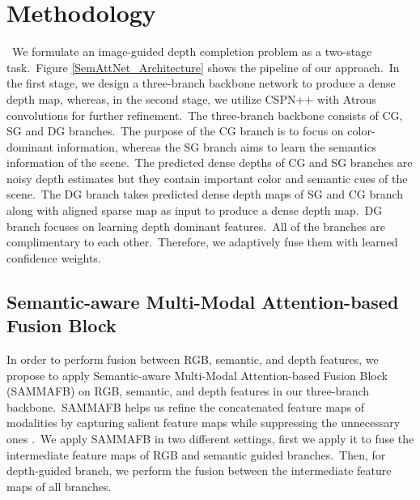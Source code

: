 \documentclass{ieeeaccess}
\begin{document}
\section{Methodology}


~We formulate an image-guided depth completion problem as a two-stage task.~Figure \ref{SemAttNet_Architecture} shows the pipeline of our approach.~In the first stage, we design a three-branch backbone network to produce a dense depth map, whereas, in the second stage, we utilize CSPN++ \cite{hu2020PENet, cheng2020cspn++} with Atrous convolutions for further refinement.~The three-branch backbone consists of CG, SG and DG branches.~The purpose of the CG branch is to focus on color-dominant information, whereas the SG branch aims to learn the semantics information of the scene.~The predicted dense depths of CG and SG branches are noisy depth estimates but they contain important color and semantic cues of the scene.~The DG branch takes predicted dense depth maps of SG and CG branch along with aligned sparse map as input to produce a dense depth map.~DG branch focuses on learning depth dominant features.~All of the branches are complimentary to each other.~Therefore, we adaptively fuse them with learned confidence weights.


\subsection{Semantic-aware Multi-Modal Attention-based Fusion Block}

In order to perform fusion between RGB, semantic, and depth features, we propose to apply Semantic-aware Multi-Modal Attention-based Fusion Block (SAMMAFB) on RGB, semantic, and depth features in our three-branch backbone.~SAMMAFB helps us refine the concatenated feature maps of modalities by capturing salient feature maps while suppressing the unnecessary ones \cite{fooladgar2019multi}.~We apply SAMMAFB in two different settings, first we apply it to fuse the intermediate feature maps of RGB and semantic guided branches.~Then, for depth-guided branch, we perform the fusion between the intermediate feature maps of all branches.
\end{document}

